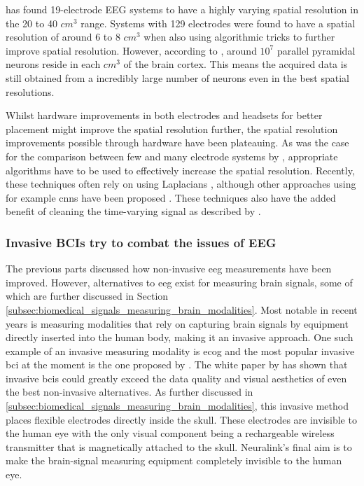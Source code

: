  has found 19-electrode EEG systems to have a highly varying spatial resolution in the 20 to 40 $cm^3$ range.
Systems with 129 electrodes were found to have a spatial resolution of around 6 to 8 $cm^3$ \citep{spatial_resolution} when also using algorithmic tricks to further improve spatial resolution.
However, according to \citet{neurons_book}, around $10^7$ parallel pyramidal neurons reside in each $cm^3$ of the brain cortex.
This means the acquired data is still obtained from a incredibly large number of neurons even in the best spatial resolutions.

Whilst hardware improvements in both electrodes and headsets for better placement might improve the spatial resolution further, the spatial resolution improvements possible through hardware have been plateauing.
As was the case for the comparison between few and many electrode systems by \citet{spatial_resolution}, appropriate algorithms have to be used to effectively increase the spatial resolution.
Recently, these techniques often rely on using Laplacians \citep{improve_eeg_spatial_laplacian1, improve_eeg_spatial_laplacian2, improve_eeg_spatial_laplacian3}, although other approaches using for example \glspl{cnn} have been proposed \citep{improve_eeg_spatial_cnn}.
These techniques also have the added benefit of cleaning the time-varying signal as described by \citet{improve_eeg_spatial_comparison}.


\subsubsection{Invasive BCIs try to combat the issues of EEG}
\label{subsubsec:bci_gaining_popularity_better_measuring_invasive}

The previous parts discussed how non-invasive \gls{eeg} measurements have been improved.
However, alternatives to \gls{eeg} exist for measuring brain signals, some of which are further discussed in Section \ref{subsec:biomedical_signals_measuring_brain_modalities}.
Most notable in recent years is measuring modalities that rely on capturing brain signals by equipment directly inserted into the human body, making it an invasive approach.
One such example of an invasive measuring modality is \gls{ecog} and the most popular invasive \gls{bci} at the moment is the one proposed by \citet{neuralink_whitepaper}.
The white paper by \citet{neuralink_whitepaper} has shown that invasive \glspl{bci} could greatly exceed the data quality and visual aesthetics of even the best non-invasive alternatives.
As further discussed in \ref{subsec:biomedical_signals_measuring_brain_modalities}, this invasive method places flexible electrodes directly inside the skull.
These electrodes are invisible to the human eye with the only visual component being a rechargeable wireless transmitter that is magnetically attached to the skull.
Neuralink's final aim is to make the brain-signal measuring equipment completely invisible to the human eye.


